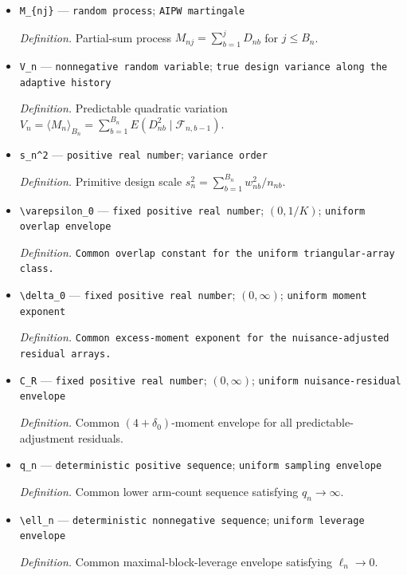 \documentclass{article}
\begin{document}
\begin{itemize}
  \item \texttt{M\_\allowbreak{}\{nj\}\allowbreak{}} --- \texttt{random process}; \texttt{AIPW martingale}
  \par\smallskip\noindent\emph{Definition.} Partial-sum process \(M_{nj}=\sum_{b=1}^{j}D_{nb}\) for \(j\le B_n\).
  \item \texttt{V\_\allowbreak{}n} --- \texttt{nonnegative random variable}; \texttt{true design variance along the adaptive history}
  \par\smallskip\noindent\emph{Definition.} Predictable quadratic variation \(V_n=\langle M_n\rangle_{B_n}=\sum_{b=1}^{B_n}E(D_{nb}^2\mid\mathcal F_{n,b-1})\).
  \item \texttt{s\_\allowbreak{}n\textasciicircum{}2} --- \texttt{positive real number}; \texttt{variance order}
  \par\smallskip\noindent\emph{Definition.} Primitive design scale \(s_n^2=\sum_{b=1}^{B_n}w_{nb}^2/n_{nb}\).
  \item \texttt{\textbackslash{}\allowbreak{}varepsilon\_\allowbreak{}0} --- \texttt{fixed positive real number}; \((0,1/K)\); \texttt{uniform overlap envelope}
  \par\smallskip\noindent\emph{Definition.} \texttt{Common overlap constant for the uniform triangular-\allowbreak{}array class.}
  \item \texttt{\textbackslash{}\allowbreak{}delta\_\allowbreak{}0} --- \texttt{fixed positive real number}; \((0,\infty)\); \texttt{uniform moment exponent}
  \par\smallskip\noindent\emph{Definition.} \texttt{Common excess-\allowbreak{}moment exponent for the nuisance-\allowbreak{}adjusted residual arrays.}
  \item \texttt{C\_\allowbreak{}R} --- \texttt{fixed positive real number}; \((0,\infty)\); \texttt{uniform nuisance-\allowbreak{}residual envelope}
  \par\smallskip\noindent\emph{Definition.} Common \((4+\delta_0)\)-moment envelope for all predictable-adjustment residuals.
  \item \texttt{q\_\allowbreak{}n} --- \texttt{deterministic positive sequence}; \texttt{uniform sampling envelope}
  \par\smallskip\noindent\emph{Definition.} Common lower arm-count sequence satisfying \(q_n\to\infty\).
  \item \texttt{\textbackslash{}\allowbreak{}ell\_\allowbreak{}n} --- \texttt{deterministic nonnegative sequence}; \texttt{uniform leverage envelope}
  \par\smallskip\noindent\emph{Definition.} Common maximal-block-leverage envelope satisfying \(\ell_n\to0\).

\end{itemize}
\end{document}
